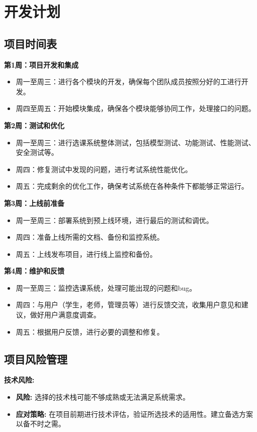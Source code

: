 \documentclass{article}
\begin{document}
\section{开发计划}
\subsection{项目时间表}
\textbf{第1周：项目开发和集成}
\begin{itemize}
  \item 周一至周三：进行各个模块的开发，确保每个团队成员按照分好的工进行开发。
  \item 周四至周五：开始模块集成，确保各个模块能够协同工作，处理接口的问题。
\end{itemize}

\textbf{第2周：测试和优化}
\begin{itemize}
  \item 周一至周三：进行选课系统整体测试，包括模型测试、功能测试、性能测试、安全测试等。
  \item 周四：修复测试中发现的问题，进行考试系统性能优化。
  \item 周五：完成剩余的优化工作，确保考试系统在各种条件下都能够正常运行。
\end{itemize}

\textbf{第3周：上线前准备}
\begin{itemize}
  \item 周一至周三：部署系统到预上线环境，进行最后的测试和调优。
  \item 周四：准备上线所需的文档、备份和监控系统。
  \item 周五：上线发布项目，进行线上监控和备份。
\end{itemize}

\textbf{第4周：维护和反馈}
\begin{itemize}
  \item 周一至周三：监控选课系统，处理可能出现的问题和bug。
  \item 周四：与用户（学生，老师，管理员等）进行反馈交流，收集用户意见和建议，做好用户满意度调查。
  \item 周五：根据用户反馈，进行必要的调整和修复。
\end{itemize}
\subsection{项目风险管理}
\textbf{技术风险:}
\begin{itemize}
  \item \textbf{风险:} 选择的技术栈可能不够成熟或无法满足系统需求。
  \item \textbf{应对策略:} 在项目前期进行技术评估，验证所选技术的适用性。建立备选方案以备不时之需。
\end{itemize}
\end{document}
